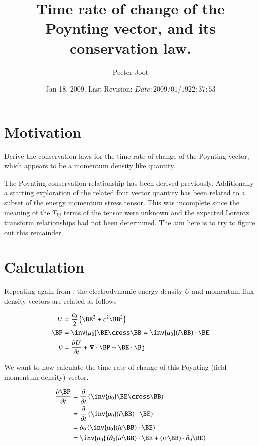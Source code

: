 \documentclass{article}
\title{ Time rate of change of the Poynting vector, and its conservation law. }
\author{Peeter Joot}
\date{ Jan 18, 2009.  Last Revision: $Date: 2009/01/19 22:37:53 $ }
\begin{document}
\maketitle{}
\tableofcontents

\section{ Motivation }

Derive the conservation laws for the time rate of change of the Poynting vector, which appears to be a momentum density like quantity.

The Poynting conservation relationship has been derived previously.  Additionally a starting
exploration
\cite{PJemstresstensor}
of the related four vector quantity has been related to a subset of the energy momentum stress tensor.
This was incomplete since the meaning of the $T_{kj}$ terms of the tensor were unknown and the expected
Lorentz transform relationships had not been determined.  The aim here is to try to figure out this remainder.

\section{ Calculation }

Repeating again from \cite{PJpoynting}, the electrodynamic energy density $U$ and momentum flux density vectors are related as follows

\begin{align}\label{eqn:fromPoyntingNotes}
U &= \frac{\epsilon_0}{2}\left( \BE^2 + c^2 \BB^2 \right) \\
\BP &= \inv{\mu_0}\BE \cross \BB = \inv{\mu_0} (i \BB) \cdot \BE \\
0 &= \PD{t}{U} + \spacegrad \cdot \BP + \BE \cdot \Bj
\end{align}

We want to now calculate the time rate of change of this Poynting (field momentum density) vector.

\begin{align*}
\PD{t}{\BP}
&= \PD{t}{} \left( \inv{\mu_0} \BE \cross \BB \right) \\
&= \PD{t}{} \left( \inv{\mu_0}(i\BB) \cdot \BE \right) \\
&= \partial_0 \left( \inv{\mu_0}(i c\BB) \cdot \BE \right) \\
&= \inv{\mu_0} \left( \partial_0 (i c\BB) \cdot \BE  + (i c\BB) \cdot \partial_0 \BE  \right)
\end{align*}
\end{document}
